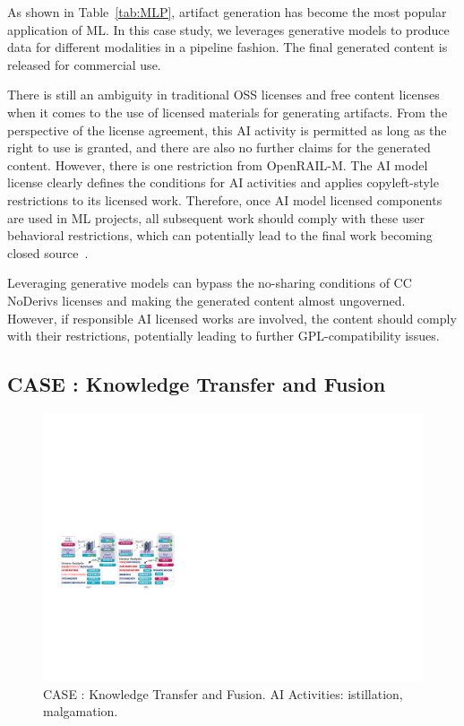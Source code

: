 As shown in Table~\ref{tab:MLP}, artifact generation has become the most popular application of ML.
In this case study, we leverages generative models to produce data for different modalities in a pipeline fashion.
The final generated content is released for commercial use.

There is still an ambiguity in traditional OSS licenses and free content licenses when it comes to the use of licensed materials for generating artifacts.
From the perspective of the license agreement, this AI activity is permitted as long as the right to use is granted, and there are also no further claims for the generated content.
However, there is one restriction from OpenRAIL-M. 
The AI model license clearly defines the conditions for AI activities and applies copyleft-style restrictions to its licensed work. 
Therefore, once AI model licensed components are used in ML projects, all subsequent work should comply with these user behavioral restrictions, which can potentially lead to the final work becoming closed source~\cite{greenbaum2016the}.

Leveraging generative models can bypass the no-sharing conditions of CC NoDerivs licenses and making the generated content almost ungoverned.
However, if responsible AI licensed works are involved, the content should comply with their restrictions, potentially leading to further GPL-compatibility issues.

\subsection{CASE  : Knowledge Transfer and Fusion}

\begin{figure}[h]
    \centering
    \includegraphics[width=\linewidth]{fig/case4.pdf}
    \caption{CASE : Knowledge Transfer and Fusion.  AI Activities: istillation, malgamation.}
    \Description{}
    \label{fig:case4}
\end{figure}

